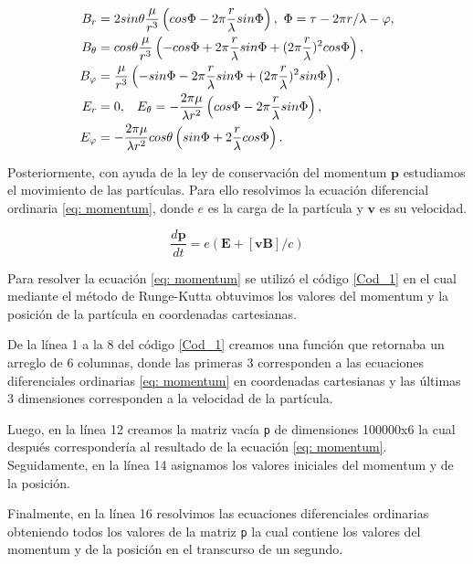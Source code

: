 \documentclass{article}
\begin{document}
\begin{align}
    B_r &= 2sin\theta \frac{\mu}{r^3}\left( cos\Phi - 2\pi \frac{r}{\lambda} sin\Phi \right), \,  \, \Phi= \tau - 2\pi r/\lambda - \varphi,  \notag \\
    B_{\theta} &= cos \theta \frac{\mu}{r^3} \left( - cos \Phi + 2\pi \frac{r}{\lambda} sin \Phi + (2\pi\frac{r}{\lambda})^2 cos\Phi\right), \, \notag\\
    B_{\varphi} &= \frac{\mu}{r^3} \left( -sin\Phi - 2\pi \frac{r}{\lambda}sin\Phi + (2\pi\frac{r}{\lambda})^2 sin \Phi \right), \notag \\
    E_r &= 0, \hspace{3mm} E_{\theta} = - \frac{2\pi\mu}{\lambda r^2} \left( cos \Phi - 2\pi\frac{r}{\lambda}sin \Phi \right),  \notag \\ 
     E_{\varphi} &= - \frac{2\pi\mu}{\lambda r^2} cos \theta \left( sin \Phi + 2\frac{r}{\lambda} cos \Phi \right) .\label{eq: formulas}
\end{align}

Posteriormente, con ayuda de la ley de conservación del momentum $\textbf{p}$ estudiamos el movimiento de las partículas. Para ello resolvimos la ecuación diferencial ordinaria \ref{eq: momentum}, donde $e$ es la carga de la partícula y $\textbf{v}$ es su velocidad. 

\begin{equation}
    \frac{d\textbf{p}}{dt} = e(\textbf{E} + [\textbf{v}\textbf{B}]/c ) \label{eq: momentum}
\end{equation}

Para resolver la ecuación \ref{eq: momentum}  se utilizó el código \ref{Cod_1} en el cual mediante el método de Runge-Kutta obtuvimos los valores del momentum y la posición de la partícula en coordenadas cartesianas.

\vspace{2mm}
De la línea 1 a la 8 del código \ref{Cod_1} creamos una función que retornaba un arreglo de 6 columnas, donde las primeras 3  corresponden a las ecuaciones diferenciales ordinarias \ref{eq: momentum} en coordenadas cartesianas y las últimas 3 dimensiones corresponden a la velocidad de la partícula.

Luego, en la línea 12 creamos la matriz vacía \texttt{p} de dimensiones 100000x6 la cual después correspondería al resultado de la ecuación \ref{eq: momentum}. Seguidamente, en la línea 14 asignamos los valores iniciales del momentum y de la posición. 

Finalmente, en la línea 16 resolvimos las ecuaciones diferenciales ordinarias obteniendo todos los valores de la matriz \texttt{p} la cual contiene los valores del momentum y de la posición en el transcurso de un segundo.
\end{document}
